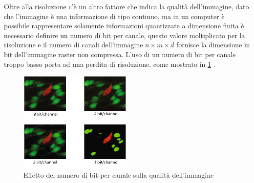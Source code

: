 Oltre alla risoluzione c'è un altro fattore che indica la qualità dell'immagine, dato che l'immagine è una informazione di tipo continuo, ma in un computer è possibile rappresentare solamente informazioni quantizzate a dimensione finita è necessario definire un numero di bit per canale, questo valore moltiplicato per la risoluzione e il numero di canali dell'immagine  \(n\times m \times d\) fornisce la dimensione in bit dell'immagine raster non compressa. L'uso di un numero di bit per canale  troppo basso porta ad una perdita di risoluzione, come mostrato in \cref{fig:bit-channel}  \cite{gonzalez_dip} \cite{spaepen_resolution}.

\begin{figure}[ht]
    \centering
    \includegraphics[width=0.5\textwidth]{frame/bit-channel.png}
    \caption{Effetto del numero di bit per canale sulla qualità dell'immagine}
    \label{fig:bit-channel}
\end{figure}





